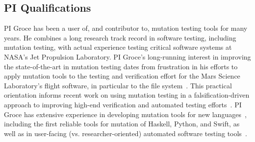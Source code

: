 \subsection{PI Qualifications}

PI Groce has been a user of, and contributor to, mutation testing tools for many years.  He combines a long research track record in software testing, including mutation testing, with actual experience testing critical software systems at NASA's Jet Propulsion Laboratory.  PI Groce's long-running interest in improving the state-of-the-art in mutation testing dates from frustration in his efforts to apply mutation tools to the testing and verification effort for the Mars Science Laboratory's flight software, in particular to the file system~\cite{ICSEDiff,CFV08,AMAI}.  This practical orientation informs recent work on using mutation testing in a falsification-driven approach to improving high-end verification and automated testing efforts~\cite{groce2015verified,groce2018verified,mutKernel}.  PI Groce has extensive experience in developing mutation tools for new languages~\cite{le2014mucheck,muupi,regexpMut}, including the first reliable tools for mutation of Haskell, Python, and Swift, as well as in user-facing (vs. researcher-oriented) automated software testing tools~\cite{tstlsttt,DeepState}.